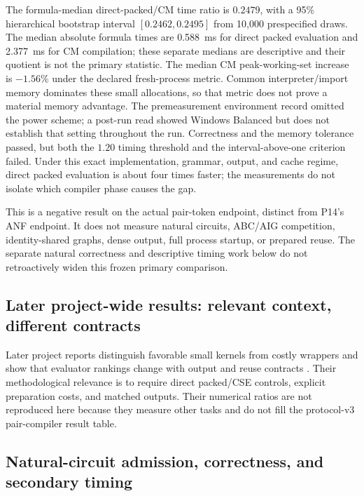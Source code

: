 \documentclass[10pt]{article}
\theoremstyle{plain}
\theoremstyle{definition}
\theoremstyle{remark}
\begin{document}
The formula-median direct-packed/CM time ratio is $0.2479$, with a 95\% hierarchical bootstrap interval $[0.2462,0.2495]$ from 10,000 prespecified draws. The median absolute formula times are 0.588~ms for direct packed evaluation and 2.377~ms for CM compilation; these separate medians are descriptive and their quotient is not the primary statistic. The median CM peak-working-set increase is $-1.56\%$ under the declared fresh-process metric. Common interpreter/import memory dominates these small allocations, so that metric does not prove a material memory advantage. The premeasurement environment record omitted the power scheme; a post-run read showed Windows Balanced but does not establish that setting throughout the run. Correctness and the memory tolerance passed, but both the $1.20$ timing threshold and the interval-above-one criterion failed. Under this exact implementation, grammar, output, and cache regime, direct packed evaluation is about four times faster; the measurements do not isolate which compiler phase causes the gap.

This is a negative result on the actual pair-token endpoint, distinct from P14's ANF endpoint. It does not measure natural circuits, ABC/AIG competition, identity-shared graphs, dense output, full process startup, or prepared reuse. The separate natural correctness and descriptive timing work below do not retroactively widen this frozen primary comparison.

\subsection{Later project-wide results: relevant context, different contracts}
\label{sec:later-context}

Later project reports distinguish favorable small kernels from costly wrappers and show that evaluator rankings change with output and reuse contracts \cite{ProjectCorrection20260825,ProjectArchitecture20260903}. Their methodological relevance is to require direct packed/CSE controls, explicit preparation costs, and matched outputs. Their numerical ratios are not reproduced here because they measure other tasks and do not fill the protocol-v3 pair-compiler result table.

\subsection{Natural-circuit admission, correctness, and secondary timing}
\label{sec:natural-gate}
\end{document}
